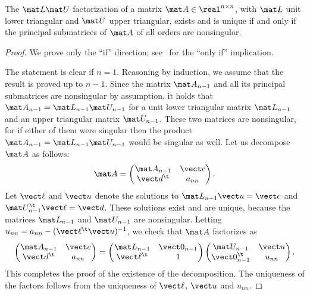 \begin{proposition}
    \label{proposition:linear_existence_lu}
    The $\mat L \mat U$ factorization of a matrix $\mat A \in \real^{n \times n}$,
    with $\mat L$ unit lower triangular and $\mat U$ upper triangular,
    exists and is unique if and only if
    the principal submatrices of $\mat A$ of all orders are nonsingular.
\end{proposition}
\begin{proof}
    We prove only the ``if'' direction; see~\cite[Theorem 3.4]{MR2265914} for the ``only if'' implication.

    The statement is clear if $n = 1$.
    Reasoning by induction,
    we assume that the result is proved up to $n - 1$.
    Since the matrix $\mat A_{n-1}$ and all its principal submatrices are nonsingular by assumption,
    it holds that $\mat A_{n-1} = \mat L_{n-1} \mat U_{n-1}$
    for a unit lower triangular matrix $\mat L_{n-1}$ and an upper triangular matrix $\mat U_{n-1}$.
    These two matrices are nonsingular,
    for if either of them were singular then the product $\mat A_{n-1} = \mat L_{n-1} \mat U_{n-1}$ would be singular as well.
    Let us decompose~$\mat A$ as follows:
    \[
        \mat A =
        \begin{pmatrix}
            \mat A_{n-1} & \vect c \\
            \vect d^\t & a_{nn}
        \end{pmatrix}.
    \]
    Let $\vect \ell$ and $\vect u$ denote the solutions to $\mat L_{n-1} \vect u = \vect c$ and $\mat U_{n-1}^\t \vect \ell = \vect d$.
    These solutions exist and are unique,
    because the matrices $\mat L_{n-1}$ and $\mat U_{n-1}$ are nonsingular.
    Letting $u_{nn} = a_{nn} - (\vect \ell^\t \vect u)^{-1}$,
    we check that $\mat A$ factorizes as
    \[
        \begin{pmatrix}
            \mat A_{n-1} & \vect c \\
            \vect d^\t & a_{nn}
        \end{pmatrix}
        =
        \begin{pmatrix}
            \mat L_{n-1} & \vect 0_{n-1} \\
            \vect \ell^\t & 1
        \end{pmatrix}
        \begin{pmatrix}
            \mat U_{n-1} & \vect u \\
            \vect 0_{n-1}^\t & u_{nn}
        \end{pmatrix}.
    \]
    This completes the proof of the existence of the decomposition.
    The uniqueness of the factors follows from the uniqueness of $\vect \ell$, $\vect u$ and $u_{nn}$.
\end{proof}


